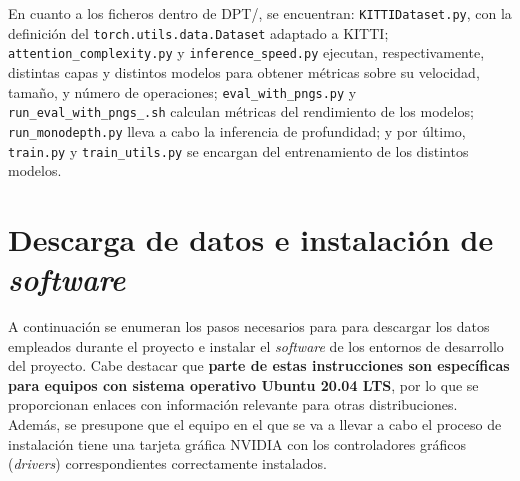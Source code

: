 En cuanto a los ficheros dentro de DPT/, se encuentran: \texttt{KITTIDataset.py}, con la definición del \texttt{torch.utils.data.Dataset} adaptado a KITTI; \texttt{attention{\_}complexity.py} y \texttt{inference{\_}speed.py} ejecutan, respectivamente, distintas capas y distintos modelos para obtener métricas sobre su velocidad, tamaño, y número de operaciones; \texttt{eval{\_}with{\_}pngs.py} y \texttt{run{\_}eval{\_}with{\_}pngs{\_}.sh} calculan métricas del rendimiento de los modelos; \texttt{run{\_}monodepth.py} lleva a cabo la inferencia de profundidad; y por último, \texttt{train.py} y \texttt{train{\_}utils.py} se encargan del entrenamiento de los distintos modelos.

\pagebreak


\section{Descarga de datos e instalación de \textit{software}}
A continuación se enumeran los pasos necesarios para para descargar los datos empleados durante el proyecto e instalar el \textit{software} de los entornos de desarrollo del proyecto. Cabe destacar que \textbf{parte de estas instrucciones son específicas para equipos con sistema operativo Ubuntu 20.04 LTS}, por lo que se proporcionan enlaces con información relevante para otras distribuciones. Además, se presupone que el equipo en el que se va a llevar a cabo el proceso de instalación tiene una tarjeta gráfica NVIDIA con los controladores gráficos (\textit{drivers}) correspondientes correctamente instalados.


